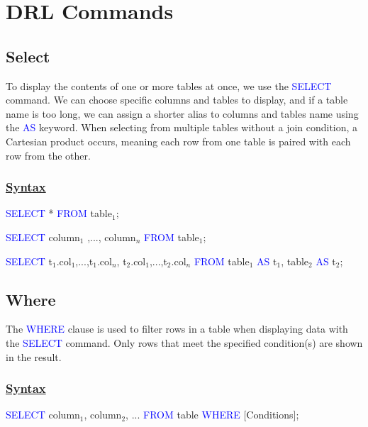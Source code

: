 \section{DRL Commands}
\subsection{Select}


\begin{tcolorbox}[title = Definition]
To display the contents of one or more tables at once, we use the \textcolor{blue}{SELECT} command. We can choose
specific columns and tables to display, and if a table name is too long, we can assign a shorter alias to columns and 
tables name using the \textcolor{blue}{AS} keyword. When selecting from multiple tables without a join condition, a Cartesian product occurs, meaning each row from one table is paired with each row from the other.
\end{tcolorbox}

\subsubsection*{\underline{Syntax}}
\begin{tcolorbox}[title = Table Selection]
\textcolor{blue}{SELECT} * \textcolor{blue}{FROM} table$_{1}$;

\textcolor{blue}{SELECT} column$_{1}$ ,..., column$_{n}$ \textcolor{blue}{FROM} table$_{1}$;

\textcolor{blue}{SELECT} t$_{1}$.col$_{1}$,...,t$_{1}$.col$_{n}$, t$_{2}$.col$_{1}$,...,t$_{2}$.col$_{n}$ \textcolor{blue}{FROM} table$_{1}$ \textcolor{blue}{AS} t$_{1}$, table$_{2}$ \textcolor{blue}{AS} t$_{2}$;
\end{tcolorbox}
\subsection{Where}
\begin{tcolorbox}[title = Definition]
The \textcolor{blue}{WHERE} clause is used to filter rows in a table when displaying data with the
\textcolor{blue}{SELECT} command. Only rows that meet the specified condition(s) are shown in the result.
\end{tcolorbox}
\subsubsection*{\underline{Syntax}}
\begin{tcolorbox}[title = Where Clause]
 \textcolor{blue}{SELECT} column$_{1}$, column$_{2}$, ... \textcolor{blue}{FROM} table \textcolor{blue}{WHERE} {[Conditions]};
\end{tcolorbox}
